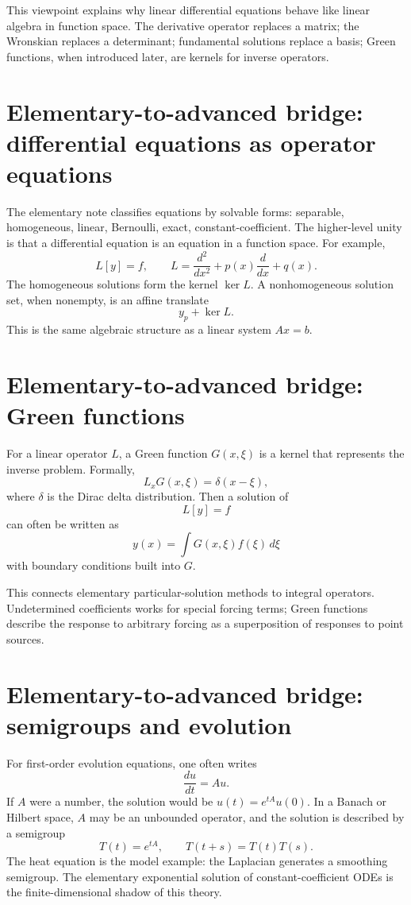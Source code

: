 This viewpoint explains why linear differential equations behave like linear algebra in function space.  The derivative operator replaces a matrix; the Wronskian replaces a determinant; fundamental solutions replace a basis; Green functions, when introduced later, are kernels for inverse operators.

\section{Elementary-to-advanced bridge: differential equations as operator equations}

The elementary note classifies equations by solvable forms: separable, homogeneous, linear, Bernoulli, exact, constant-coefficient.  The higher-level unity is that a differential equation is an equation in a function space.  For example,
\[
  L[y]=f,\qquad L=\frac{d^2}{dx^2}+p(x)\frac d{dx}+q(x).
\]
The homogeneous solutions form the kernel $\ker L$.  A nonhomogeneous solution set, when nonempty, is an affine translate
\[
  y_p+\ker L.
\]
This is the same algebraic structure as a linear system $Ax=b$.

\section{Elementary-to-advanced bridge: Green functions}

For a linear operator $L$, a Green function $G(x,\xi)$ is a kernel that represents the inverse problem.  Formally,
\[
  L_xG(x,\xi)=\delta(x-\xi),
\]
where $\delta$ is the Dirac delta distribution.  Then a solution of
\[
  L[y]=f
\]
can often be written as
\[
  y(x)=\int G(x,\xi)f(\xi)\,d\xi
\]
with boundary conditions built into $G$.

This connects elementary particular-solution methods to integral operators.  Undetermined coefficients works for special forcing terms; Green functions describe the response to arbitrary forcing as a superposition of responses to point sources.

\section{Elementary-to-advanced bridge: semigroups and evolution}

For first-order evolution equations, one often writes
\[
  \frac{du}{dt}=Au.
\]
If $A$ were a number, the solution would be $u(t)=e^{tA}u(0)$.  In a Banach or Hilbert space, $A$ may be an unbounded operator, and the solution is described by a semigroup
\[
  T(t)=e^{tA},\qquad T(t+s)=T(t)T(s).
\]
The heat equation is the model example: the Laplacian generates a smoothing semigroup.  The elementary exponential solution of constant-coefficient ODEs is the finite-dimensional shadow of this theory.

